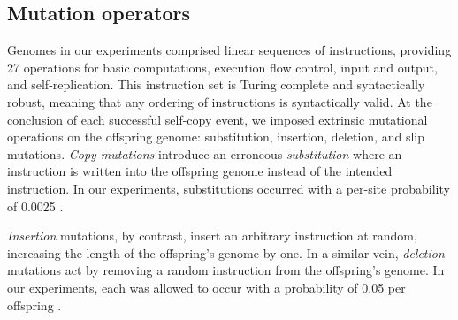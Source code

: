 \subsection{Mutation operators}

Genomes in our experiments comprised linear sequences of instructions, providing 27 operations for basic computations, execution flow control, input and output, and self-replication.
This instruction set is Turing complete and syntactically robust, meaning that any ordering of instructions is syntactically valid.
At the conclusion of each successful self-copy event, we imposed extrinsic mutational operations on the offspring genome: substitution, insertion, deletion, and slip mutations.
\textit{Copy mutations} introduce an erroneous \textit{substitution} where an instruction is written into the offspring genome instead of the intended instruction.
In our experiments, substitutions occurred with a per-site probability of 0.0025 \citep{lenski2003evolutionary}.

\textit{Insertion} mutations, by contrast, insert an arbitrary instruction at random, increasing the length of the offspring's genome by one.
In a similar vein, \textit{deletion} mutations act by removing a random instruction from the offspring's genome.
In our experiments, each was allowed to occur with a probability of 0.05 per offspring \citep{lenski2003evolutionary}.

